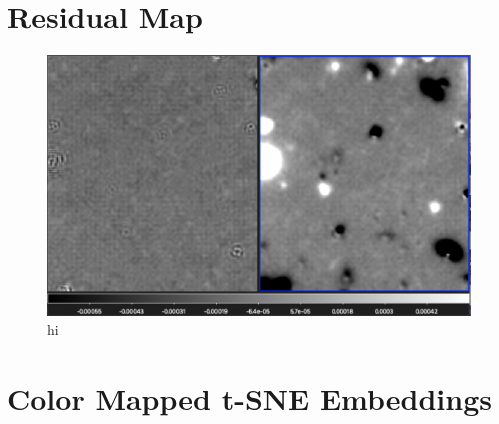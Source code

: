 \section{Residual Map}

\begin{figure}[h!]
    \centering
    \includegraphics[scale=0.5]{Code/Saved_Figures/Comparing_residual_maps.png}
    \caption{hi}
    \label{Comparing_residual_maps}
\end{figure}

\section{Color Mapped t-SNE Embeddings}